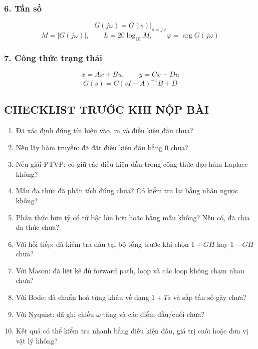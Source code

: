 \subsubsection*{6. Tần số}

\[
\boxed{
G(j\omega)=G(s)\big|_{s=j\omega}
}
\]
\[
\boxed{
M=|G(j\omega)|,\qquad
L=20\log_{10}M,\qquad
\varphi=\arg G(j\omega)
}
\]

\subsubsection*{7. Công thức trạng thái}

\[
\boxed{
\dot x=Ax+Bu,\qquad y=Cx+Du
}
\]
\[
\boxed{
G(s)=C(sI-A)^{-1}B+D
}
\]

\subsection*{CHECKLIST TRƯỚC KHI NỘP BÀI}

\begin{enumerate}
  \item Đã xác định đúng tín hiệu vào, ra và điều kiện đầu chưa?
  \item Nếu lấy hàm truyền: đã đặt điều kiện đầu bằng 0 chưa?
  \item Nếu giải PTVP: có giữ các điều kiện đầu trong công thức đạo hàm Laplace không?
  \item Mẫu đa thức đã phân tích đúng chưa? Có kiểm tra lại bằng nhân ngược không?
  \item Phân thức hữu tỷ có tử bậc lớn hơn hoặc bằng mẫu không? Nếu có, đã chia đa thức chưa?
  \item Với hồi tiếp: đã kiểm tra dấu tại bộ tổng trước khi chọn $1+GH$ hay $1-GH$ chưa?
  \item Với Mason: đã liệt kê đủ forward path, loop và các loop không chạm nhau chưa?
  \item Với Bode: đã chuẩn hoá từng khâu về dạng $1+Ts$ và sắp tần số gãy chưa?
  \item Với Nyquist: đã ghi chiều $\omega$ tăng và các điểm đầu/cuối chưa?
  \item Kết quả có thể kiểm tra nhanh bằng điều kiện đầu, giá trị cuối hoặc đơn vị vật lý không?
\end{enumerate}

